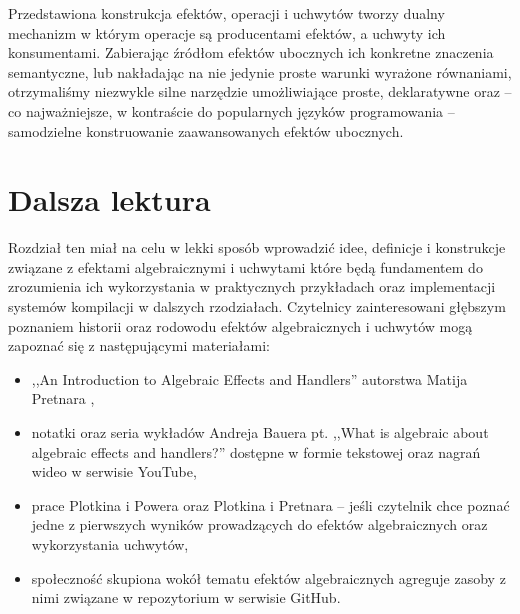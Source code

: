 Przedstawiona konstrukcja efektów, operacji i uchwytów tworzy dualny mechanizm w którym operacje są producentami efektów, a uchwyty ich konsumentami. Zabierając źródłom efektów ubocznych ich konkretne znaczenia semantyczne, lub nakładając na nie jedynie proste warunki wyrażone równaniami, otrzymaliśmy niezwykle silne narzędzie umożliwiające proste, deklaratywne oraz -- co najważniejsze, w kontraście do popularnych języków programowania -- samodzielne konstruowanie zaawansowanych efektów ubocznych.

\section{Dalsza lektura}

Rozdział ten miał na celu w lekki sposób wprowadzić idee, definicje i konstrukcje związane z efektami algebraicznymi i uchwytami które będą fundamentem do zrozumienia ich wykorzystania w praktycznych przykładach oraz implementacji systemów kompilacji w dalszych rzodziałach. Czytelnicy zainteresowani głębszym poznaniem historii oraz rodowodu efektów algebraicznych i uchwytów mogą zapoznać się z następującymi materiałami:

\begin{itemize}
\item ,,An Introduction to Algebraic Effects and Handlers'' autorstwa Matija Pretnara \cite{pretnar2015introduction},
\item notatki oraz seria wykładów Andreja Bauera pt. ,,What is algebraic about algebraic effects and handlers?'' \cite{bauer2018algebraic} dostępne w formie tekstowej oraz nagrań wideo w serwisie YouTube,
\item prace Plotkina i Powera \cite{plotkin2001semantics, plotkin2002computational} oraz Plotkina i Pretnara \cite{plotkin2013handling} -- jeśli czytelnik chce poznać jedne z pierwszych wyników prowadzących do efektów algebraicznych oraz wykorzystania uchwytów,
\item społeczność skupiona wokół tematu efektów algebraicznych agreguje zasoby z nimi związane w repozytorium \cite{effectsbibliography} w serwisie GitHub.

\end{itemize}

